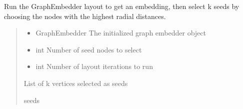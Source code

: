 \documentclass[letterpaper,10pt,english]{sphinxmanual}
\begin{document}
\begin{fulllineitems}
\label{\detokenize{api_reference:id33}}
\pysigstartsignatures
{}
\pysigstopsignatures
\sphinxAtStartPar
Run the GraphEmbedder layout to get an embedding, then select
k seeds by choosing the nodes with the highest radial distances.
\begin{quote}\begin{description}
\begin{itemize}
\item {} 
\sphinxAtStartPar
{} \textendash{} GraphEmbedder
The initialized graph embedder object

\item {} 
\sphinxAtStartPar
{} \textendash{} int
Number of seed nodes to select

\item {} 
\sphinxAtStartPar
{} \textendash{} int
Number of layout iterations to run

\end{itemize}

\sphinxAtStartPar
\begin{description}
\sphinxAtStartPar
List of k vertices selected as seeds

\end{description}


\sphinxAtStartPar
seeds

\end{description}\end{quote}

\end{fulllineitems}

\end{document}
